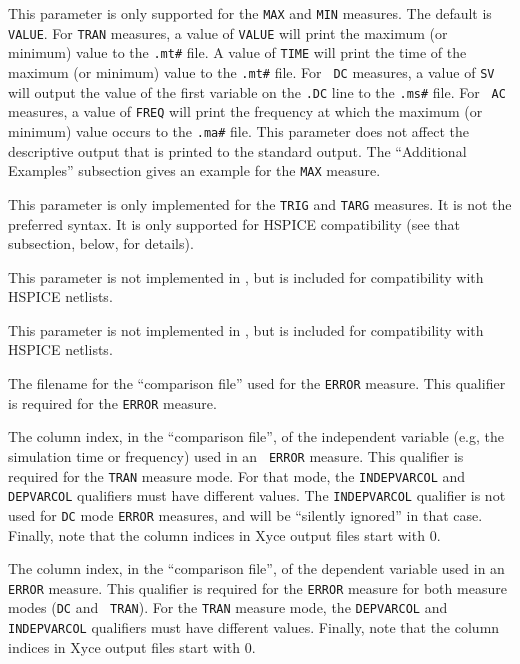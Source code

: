 \begin{Command}
\begin{Arguments}

This parameter is only supported for the {\tt MAX} and {\tt MIN}
measures.  The default is {\tt VALUE}.  For {\tt TRAN} measures, a
value of {\tt VALUE} will print the maximum (or minimum) value to
the \texttt {.mt\#} file.  A value of {\tt TIME} will print the time
of the maximum (or minimum) value to the \texttt{.mt\#} file. For {\tt
DC} measures, a value of {\tt SV} will output the value of the first
variable on the {\tt .DC} line to the \texttt{.ms\#} file.  For {\tt
AC} measures, a value of {\tt FREQ} will print the frequency at which
the maximum (or minimum) value occurs to the \texttt{.ma\#} file.
This parameter does not affect the descriptive output that is printed
to the standard output.  The ``Additional Examples'' subsection gives
an example for the {\tt MAX} measure.

This parameter is only implemented for the {\tt TRIG} and {\tt TARG}
measures.  It is not the preferred \Xyce{} syntax. It is only
supported for HSPICE compatibility (see that subsection, below, for
details).


This parameter is not implemented in \Xyce{}, but is included for compatibility
with HSPICE netlists.


This parameter is not implemented in \Xyce{}, but is included for compatibility
with HSPICE netlists.

The filename for the ``comparison file'' used for the {\tt ERROR}
measure.  This qualifier is required for the {\tt ERROR} measure.

The column index, in the ``comparison file'', of the independent
variable (e.g, the simulation time or frequency) used in an {\tt
ERROR} measure.  This qualifier is required for the {\tt TRAN} measure
mode.  For that mode, the {\tt INDEPVARCOL} and {\tt DEPVARCOL}
qualifiers must have different values.  The {\tt INDEPVARCOL}
qualifier is not used for {\tt DC} mode {\tt ERROR} measures, and will
be ``silently ignored'' in that case.  Finally, note that the column
indices in Xyce output files start with 0.

The column index, in the ``comparison file'', of the dependent
variable used in an {\tt ERROR} measure.  This qualifier is required
for the {\tt ERROR} measure for both measure modes ({\tt DC} and {\tt
TRAN}).  For the {\tt TRAN} measure mode, the {\tt DEPVARCOL} and {\tt
INDEPVARCOL} qualifiers must have different values.  Finally, note
that the column indices in Xyce output files start with 0.


\end{Arguments}
\end{Command}
